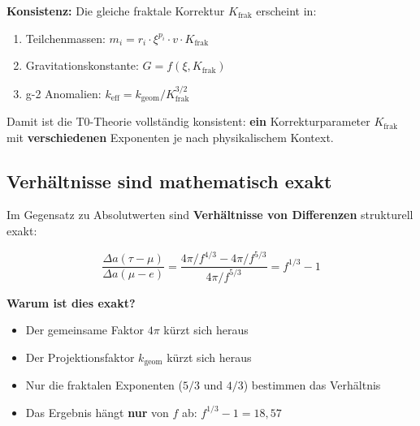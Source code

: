 	\textbf{Konsistenz:} Die gleiche fraktale Korrektur $K_\text{frak}$ erscheint in:
	\begin{enumerate}
		\item Teilchenmassen: $m_i = r_i \cdot \xi^{p_i} \cdot v \cdot K_\text{frak}$
		\item Gravitationskonstante: $G = f(\xi, K_\text{frak})$
		\item g-2 Anomalien: $k_\text{eff} = k_\text{geom} / K_\text{frak}^{3/2}$
	\end{enumerate}
	
	Damit ist die T0-Theorie vollständig konsistent: \textbf{ein} Korrekturparameter $K_\text{frak}$ mit \textbf{verschiedenen} Exponenten je nach physikalischem Kontext.
	
	\subsection{Verhältnisse sind mathematisch exakt}
	
	Im Gegensatz zu Absolutwerten sind \textbf{Verhältnisse von Differenzen} strukturell exakt:
	
	\begin{equation}
		\frac{\Delta a(\tau - \mu)}{\Delta a(\mu - e)} = \frac{4\pi/f^{4/3} - 4\pi/f^{5/3}}{4\pi/f^{5/3}} = f^{1/3} - 1
	\end{equation}
	
	\textbf{Warum ist dies exakt?}
	
	\begin{itemize}
		\item Der gemeinsame Faktor $4\pi$ kürzt sich heraus
		\item Der Projektionsfaktor $k_{\text{geom}}$ kürzt sich heraus
		\item Nur die fraktalen Exponenten ($5/3$ und $4/3$) bestimmen das Verhältnis
		\item Das Ergebnis hängt \textbf{nur} von $f$ ab: $f^{1/3} - 1 = 18{,}57$
	\end{itemize}
	
